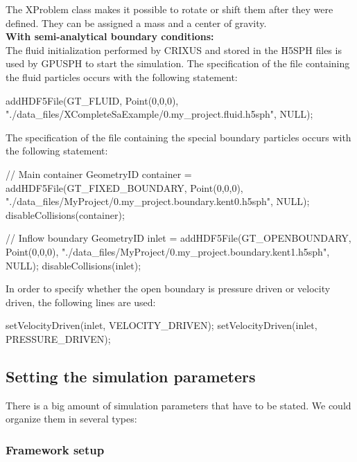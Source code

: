 \documentclass[12pt]{memoir}
\begin{document}
The XProblem class makes it possible to rotate or shift them after they were defined.
They can be assigned a mass and a center of gravity.\\

\textbf{With semi-analytical boundary conditions:}\\

The fluid initialization performed by CRIXUS and stored in the H5SPH 
files is used by GPUSPH to start the simulation. 
The specification of the file containing the fluid particles occurs with the following statement:
\begin{ccode}
addHDF5File(GT_FLUID, Point(0,0,0), 
"./data_files/XCompleteSaExample/0.my_project.fluid.h5sph",
NULL);
\end{ccode}
The specification of the file containing the special boundary particles  occurs with the following statement:\\

\begin{ccode}
  // Main container
  GeometryID container =
  addHDF5File(GT_FIXED_BOUNDARY, Point(0,0,0), 
  "./data_files/MyProject/0.my_project.boundary.kent0.h5sph",
  NULL);
  disableCollisions(container);
  
  // Inflow boundary 
  GeometryID inlet =
  addHDF5File(GT_OPENBOUNDARY, Point(0,0,0), 
  "./data_files/MyProject/0.my_project.boundary.kent1.h5sph",
  NULL);
  disableCollisions(inlet);
\end{ccode}

In order to specify whether the open boundary is pressure driven or velocity driven, the following lines
are used:
\begin{shellcode}
setVelocityDriven(inlet, VELOCITY_DRIVEN);
setVelocityDriven(inlet, PRESSURE_DRIVEN);
\end{shellcode}

\subsection{Setting the simulation parameters}
There is a big amount of simulation parameters that have to be stated. 
We could organize them in several types:
\subsubsection{Framework setup}
\end{document}
